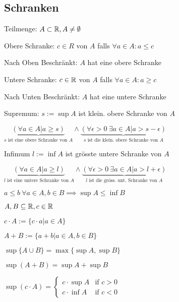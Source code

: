 \subsection{Schranken}
\begin{compactdesc}
    \item[Teilmenge:] $A \subset \mathbb{R}, A \neq \emptyset$
    \item[Obere Schranke:] $c \in R$ von $A$ falls  $\forall a \in A: a \le c$
    \item[Nach Oben Beschränkt:] $A$ hat eine obere Schranke
    \item[Untere Schranke:] $c \in \mathbb{R}$ von $A$ falls $\forall a \in A: a \ge c$
    \item[Nach Unten Beschränkt:] $A$ hat eine untere Schranke
    \item[Supremum:] $s:= \sup A$ ist klein. obere Schranke von $A$
    \item $\underbrace{\left( \forall a \in  A | a \ge  s \right)}_{s \text{ ist eine obere Schranke von } A} \wedge \underbrace{\left( \forall  \epsilon > 0 \ \exists a \in A | a > s - \epsilon \right)}_{s \text{ ist die klein. obere Schranke von } A}  $
    \item[Infimum] $l:= \inf A$ ist grösste untere Schranke von $A$
    \item $\underbrace{\left( \forall a \in  A | a \ge  l \right)}_{l \text{ ist eine untere Schranke von } A} \wedge \underbrace{\left( \forall  \epsilon > 0 \ \exists a \in A | a > l + \epsilon \right)}_{l \text{ ist die gröss. unt. Schranke von } A}  $
\end{compactdesc}

\begin{compactitem}
    \item $a \le b \ \forall a \in A, b \in B \implies \sup A \le \inf B$
    \item $A, B \subseteq \mathbb{R}, c \in \mathbb{R}$
        \begin{compactitem}
            \item $c \cdot A := \{c \cdot  a | a \in  A\} $
            \item $A + B := \{a + b | a \in A, b \in B\} $
        \end{compactitem}
    \item $\sup \{A \cup B\} = \max \{\sup A, \sup B\}  $
    \item $\sup \left( A + B \right) = \sup A + \sup B $
    \item $\sup \left( c \cdot A \right) = \begin{cases}
        c \cdot \sup A & \text{if } c > 0\\
        c \cdot \inf A & \text{if } c < 0
    \end{cases} $
\end{compactitem}

